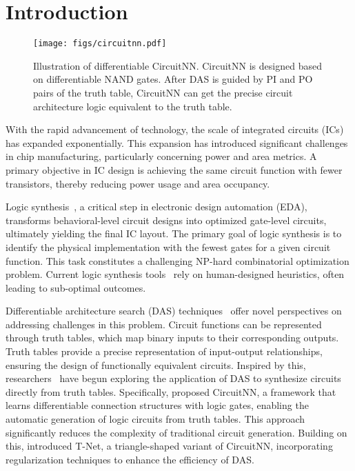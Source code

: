 \section{Introduction}
\label{sec:intro}

\begin{figure*}[tb]
    \centering
    \texttt{[image: figs/circuitnn.pdf]} 
    \caption{Illustration of differentiable CircuitNN. CircuitNN is designed based on differentiable NAND gates. After DAS is guided by PI and PO pairs of the truth table, CircuitNN can get the precise circuit architecture logic equivalent to the truth table.}
    \label{fig:circuitnn}
\end{figure*}


With the rapid advancement of technology, the scale of integrated circuits (ICs) has expanded exponentially. 
This expansion has introduced significant challenges in chip manufacturing, particularly concerning power and area metrics.
A primary objective in IC design is achieving the same circuit function with fewer transistors, thereby reducing power usage and area occupancy.

Logic synthesis~\cite{hachtel2005logicsynth}, a critical step in electronic design automation (EDA), transforms behavioral-level circuit designs into optimized gate-level circuits, ultimately yielding the final IC layout. 
The primary goal of logic synthesis is to identify the physical implementation with the fewest gates for a given circuit function. 
This task constitutes a challenging NP-hard combinatorial optimization problem. 
Current logic synthesis tools~\cite{brayton2010abc, wolf2013yosys} rely on human-designed heuristics, often leading to sub-optimal outcomes.

Differentiable architecture search (DAS) techniques~\cite{liu2018darts, chu2020darts} offer novel perspectives on addressing challenges in this problem.
Circuit functions can be represented through truth tables, which map binary inputs to their corresponding outputs. 
Truth tables provide a precise representation of input-output relationships, ensuring the design of functionally equivalent circuits.
Inspired by this, researchers~\cite{deepmind2024ai4sys, wang2024tnet} have begun exploring the application of DAS to synthesize circuits directly from truth tables.
Specifically, \citet{deepmind2024ai4sys} proposed CircuitNN, a framework that learns differentiable connection structures with logic gates, enabling the automatic generation of logic circuits from truth tables.
This approach significantly reduces the complexity of traditional circuit generation. 
Building on this, \citet{wang2024tnet} introduced T-Net, a triangle-shaped variant of CircuitNN, incorporating regularization techniques to enhance the efficiency of DAS.

